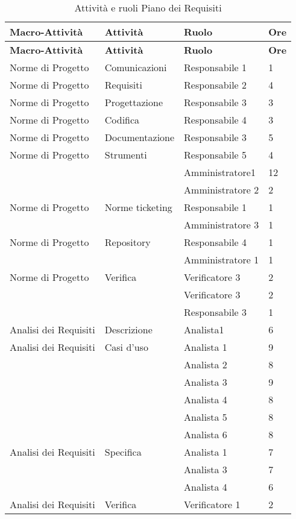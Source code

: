 {{	%
	\begin{longtable} [c]{| l | l | l | l |}
		 \hline
		 \textbf{Macro-Attivit\`{a}} & \textbf{Attivit\`{a}} & \textbf{Ruolo} & \textbf{Ore}\\
		 \hline
		 \endfirsthead
		 \hline
		 \textbf{Macro-Attivit\`{a}} & \textbf{Attivit\`{a}} & \textbf{Ruolo} & \textbf{Ore}\\
		 \hline
		\endhead
		 \hline
		 \endfoot
		 \hline
		 \caption{Attivit\`{a} e ruoli Piano dei Requisiti}
		 \endlastfoot
		Norme di Progetto & Comunicazioni & Responsabile 1 & 1\\
		Norme di Progetto & Requisiti & Responsabile 2 & 4\\
		Norme di Progetto & Progettazione & Responsabile 3 & 3\\
		Norme di Progetto & Codifica & Responsabile 4 & 3\\
		Norme di Progetto & Documentazione & Responsabile 3 & 5\\
		Norme di Progetto & Strumenti	&	Responsabile 5	&	4\\
		&	&	Amministratore1	&	12\\
		&	&	Amministratore 2	&	2\\
		Norme di Progetto & Norme ticketing &	Responsabile 1	&	1\\
		&	&	Amministratore 3 & 1\\
		Norme di Progetto & Repository &	Responsabile 4	&	1\\
		&	&	Amministratore 1	&	1\\
		Norme di Progetto & Verifica & Verificatore 3 & 2\\
		&	&	Verificatore 3 & 2\\
		&	&	Responsabile 3 & 1\\
		Analisi dei Requisiti & Descrizione & Analista1 & 6\\
		Analisi dei Requisiti & Casi d'uso & Analista 1 & 9\\
		&	&	Analista 2 & 8\\
		&	&	Analista 3 & 9\\
		&	&	Analista 4 & 8\\
		&	&	Analista 5 & 8\\
		&	&	Analista 6 & 8\\
		Analisi dei Requisiti & Specifica & Analista 1 & 7\\
		&	&	Analista 3 & 7\\
		&	&	Analista 4 & 6\\
		Analisi dei Requisiti & Verifica & Verificatore 1 & 2\\

\end{longtable}}}
